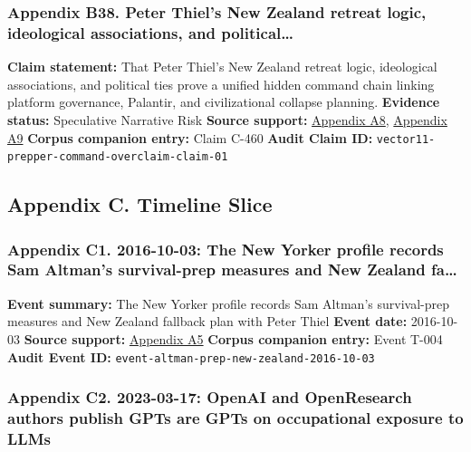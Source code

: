 \documentclass[
  american,
  11pt,
  letterpaper,
]{article}
\begin{document}
\subsubsection{Appendix B38. Peter Thiel's New Zealand retreat logic,
ideological associations, and
political\ldots{}}\label{ch-09-appendix-b38-peter-thiel-s-new-zealand-retreat-logic-ideological-associations-and-political}

\textbf{Claim statement:} That Peter Thiel's New Zealand retreat logic,
ideological associations, and political ties prove a unified hidden
command chain linking platform governance, Palantir, and civilizational
collapse planning. \textbf{Evidence status:} Speculative Narrative Risk
\textbf{Source support:}
\hyperref[ch-09-appendix-a8-why-silicon-valley-billionaires-are-prepping-for-the-apocalypse-in-new-zealand]{Appendix
A8},
\hyperref[ch-09-appendix-a9-new-zealand-woos-the-wealthy-with-golden-visa-changes]{Appendix
A9} \textbf{Corpus companion entry:} Claim C-460 \textbf{Audit Claim
ID:} \texttt{vector11-prepper-command-overclaim-claim-01}

\subsection{Appendix C. Timeline
Slice}\label{appendix-c.-timeline-slice-9}

\subsubsection{Appendix C1. 2016-10-03: The New Yorker profile records
Sam Altman's survival-prep measures and New Zealand
fa\ldots{}}\label{ch-09-appendix-c1-2016-10-03-the-new-yorker-profile-records-sam-altman-s-survival-prep-measures-and-new-zealand-fallback-plan-with-peter-thiel}

\textbf{Event summary:} The New Yorker profile records Sam Altman's
survival-prep measures and New Zealand fallback plan with Peter Thiel
\textbf{Event date:} 2016-10-03 \textbf{Source support:}
\hyperref[ch-09-appendix-a5-sam-altman-s-manifest-destiny]{Appendix A5}
\textbf{Corpus companion entry:} Event T-004 \textbf{Audit Event ID:}
\texttt{event-altman-prep-new-zealand-2016-10-03}

\subsubsection{Appendix C2. 2023-03-17: OpenAI and OpenResearch authors
publish GPTs are GPTs on occupational exposure to
LLMs}\label{ch-09-appendix-c2-2023-03-17-openai-and-openresearch-authors-publish-gpts-are-gpts-on-occupational-exposure-to-llms}
\end{document}
